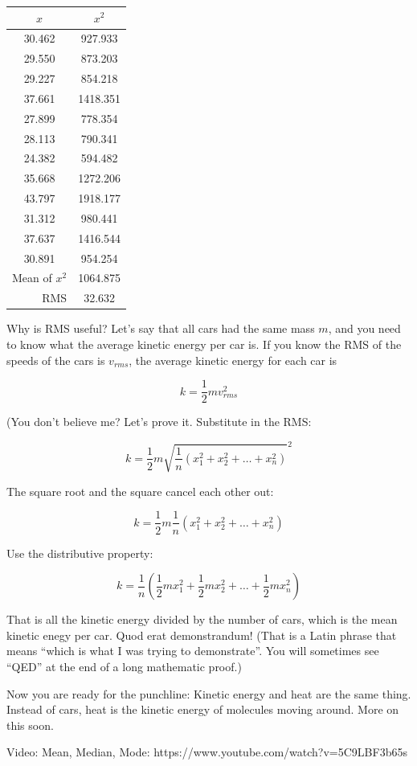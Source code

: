 \begin{tabular}{c |  c}
  $x$ & $x^2$ \\
  \hline
30.462 & 927.933 \\
29.550 & 873.203\\
29.227 & 854.218\\
37.661 & 1418.351\\
27.899 & 778.354\\
28.113 & 790.341\\
24.382 & 594.482\\
35.668 & 1272.206\\
43.797 & 1918.177\\
31.312 & 980.441\\
37.637 & 1416.544\\
30.891 & 954.254\\
\hline
\multicolumn{1}{r}{Mean of $x^2$} & {1064.875}\\
\multicolumn{1}{r}{RMS} & {32.632}
  \end{tabular}

Why is RMS useful? Let's say that all cars had the same mass $m$, and
you need to know what the average kinetic energy per car is. If you
know the RMS of the speeds of the cars is $v_{rms}$, the average kinetic energy for
each car is

$$k = \frac{1}{2}m v_{rms}^2$$

(You don't believe me? Let's prove it. Substitute in the RMS:

$$k = \frac{1}{2}m \sqrt{\frac{1}{n}\left( x_1^2 + x_2^2 + \ldots + x_n^2 \right)}^2$$

The square root and the square cancel each other out:

$$k = \frac{1}{2}m \frac{1}{n}\left( x_1^2 + x_2^2 + \ldots + x_n^2 \right)$$

Use the distributive property:

$$k = \frac{1}{n} \left( \frac{1}{2} m x_1^2 + \frac{1}{2}m x_2^2 + \ldots + \frac{1}{2}m x_n^2 \right)$$


That is all the kinetic energy divided by the number of cars, which is
the mean kinetic enegy per car. Quod erat demonstrandum! (That is a
Latin phrase that means ``which is what I was trying to
demonstrate''. You will sometimes see ``QED'' at the end of a long
mathematic proof.)

Now you are ready for the punchline: Kinetic energy and heat are the
same thing. Instead of cars, heat is the kinetic energy of molecules
moving around. More on this soon.

Video: Mean, Median, Mode: https://www.youtube.com/watch?v=5C9LBF3b65s


